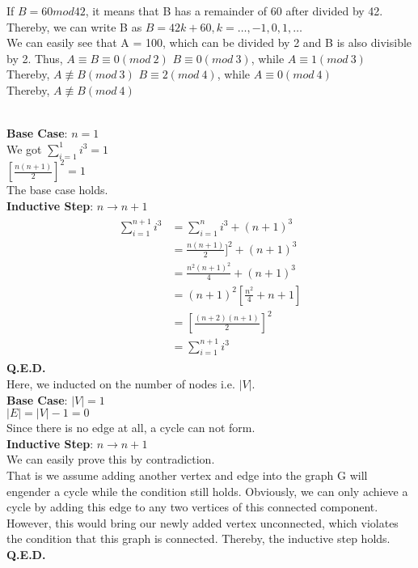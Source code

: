 \documentclass[12pt,twoside]{article}
\begin{document}
\begin{problems}
\newpage
\problem  %

\begin{problemparts}
\problempart %
If $B=60mod42$, it means that B has a remainder of 60 after divided by 42. Thereby, we can write B as $B=42k+60,k=\ldots,-1,0,1,\ldots$\\
We can easily see that A = 100, which can be divided by 2 and B is also divisible by 2. Thus, $A\equiv B\equiv 0(mod\ 2)$
\problempart %
$B\equiv 0(mod\ 3)$, while $A\equiv 1(mod\ 3)$\\
Thereby, $A\not\equiv B(mod\ 3)$
\problempart %
$B\equiv 2(mod\ 4)$, while $A\equiv 0(mod\ 4)$\\
Thereby, $A\not\equiv B(mod\ 4)$
\end{problemparts}

\problem\\  %
\textbf{Base Case}: $n=1$\\
We got $\sum\limits_{i=1}^{1}i^3=1$\\
$[\frac{n(n+1)}{2}]^2 = 1$\\
The base case holds.\\
\textbf{Inductive Step}: $n\longrightarrow n+1$\\
\begin{align}
    \begin{split}
            \sum\limits_{i=1}^{n+1}i^3 &= \sum\limits_{i=1}^{n}i^3+(n+1)^3 \\
                &= \frac{n(n+1)}{2}]^2+(n+1)^3 \\
                &= \frac{n^2(n+1)^2}{4}+(n+1)^3 \\
                &= (n+1)^2[\frac{n^2}{4}+n+1] \\
                &= [\frac{(n+2)(n+1)}{2}]^2 \\
                &= \sum\limits_{i=1}^{n+1}i^3
    \end{split}
\end{align}
\textbf{Q.E.D.}
\newpage
\problem\\  %
Here, we inducted on the number of nodes i.e. $|V|$.\\
\textbf{Base Case}: $|V|=1$\\
$|E|=|V|-1=0$\\
Since there is no edge at all, a cycle can not form.\\
\textbf{Inductive Step}: $n\longrightarrow n+1$\\
We can easily prove this by contradiction.\\
That is we assume adding another vertex and edge into the graph G will engender a cycle while the condition still holds. Obviously, we can only achieve a cycle by adding this edge to any two vertices of this connected component.\\
However, this would bring our newly added vertex unconnected, which violates the condition that this graph is connected. Thereby, the inductive step holds.\\
\textbf{Q.E.D.}



\end{problems}
\end{document}
